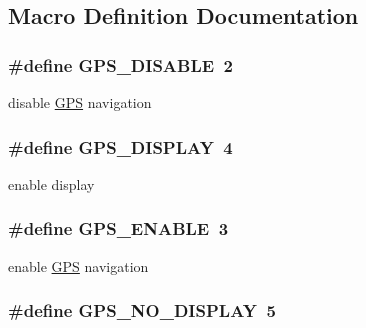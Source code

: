 \subsection{Macro Definition Documentation}
\hypertarget{group__gps__commands_ga8e394314aacedb0790203d4af6cd5710}{
\subsubsection[{G\-P\-S\-\_\-\-D\-I\-S\-A\-B\-L\-E}]{\setlength{\rightskip}{0pt plus 5cm}\#define G\-P\-S\-\_\-\-D\-I\-S\-A\-B\-L\-E~2}}\label{group__gps__commands_ga8e394314aacedb0790203d4af6cd5710}
disable \hyperlink{classGPS}{G\-P\-S} navigation \hypertarget{group__gps__commands_gad25ca4dcc3aa69da0e474e3b69cc910a}{
\subsubsection[{G\-P\-S\-\_\-\-D\-I\-S\-P\-L\-A\-Y}]{\setlength{\rightskip}{0pt plus 5cm}\#define G\-P\-S\-\_\-\-D\-I\-S\-P\-L\-A\-Y~4}}\label{group__gps__commands_gad25ca4dcc3aa69da0e474e3b69cc910a}
enable display \hypertarget{group__gps__commands_gac8383d8fc4fa97bb45f89d9a50e0966d}{
\subsubsection[{G\-P\-S\-\_\-\-E\-N\-A\-B\-L\-E}]{\setlength{\rightskip}{0pt plus 5cm}\#define G\-P\-S\-\_\-\-E\-N\-A\-B\-L\-E~3}}\label{group__gps__commands_gac8383d8fc4fa97bb45f89d9a50e0966d}
enable \hyperlink{classGPS}{G\-P\-S} navigation \hypertarget{group__gps__commands_ga3de45ac0f8b80c8044b533d47cf08e99}{
\subsubsection[{G\-P\-S\-\_\-\-N\-O\-\_\-\-D\-I\-S\-P\-L\-A\-Y}]{\setlength{\rightskip}{0pt plus 5cm}\#define G\-P\-S\-\_\-\-N\-O\-\_\-\-D\-I\-S\-P\-L\-A\-Y~5}}\label{group__gps__commands_ga3de45ac0f8b80c8044b533d47cf08e99}
